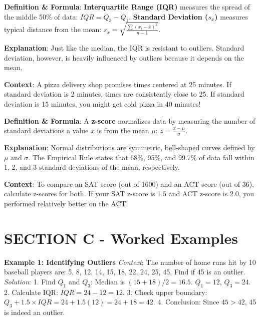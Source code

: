 \begin{lessonbox}
\textbf{Definition \& Formula}:
\textbf{Interquartile Range (IQR)} measures the spread of the middle 50\% of data: $IQR = Q_3 - Q_1$.
\textbf{Standard Deviation ($s_x$)} measures typical distance from the mean: $s_x = \sqrt{\frac{\sum (x_i - \bar{x})^2}{n-1}}$.

\textbf{Explanation}: Just like the median, the IQR is resistant to outliers. Standard deviation, however, is heavily influenced by outliers because it depends on the mean.

\textbf{Context}: A pizza delivery shop promises times centered at 25 minutes. If standard deviation is 2 minutes, times are consistently close to 25. If standard deviation is 15 minutes, you might get cold pizza in 40 minutes!
\end{lessonbox}

\begin{lessonbox}
\textbf{Definition \& Formula}: A \textbf{z-score} normalizes data by measuring the number of standard deviations a value $x$ is from the mean $\mu$: $z = \frac{x - \mu}{\sigma}$.

\textbf{Explanation}: Normal distributions are symmetric, bell-shaped curves defined by $\mu$ and $\sigma$. The Empirical Rule states that 68\%, 95\%, and 99.7\% of data fall within 1, 2, and 3 standard deviations of the mean, respectively.

\textbf{Context}: To compare an SAT score (out of 1600) and an ACT score (out of 36), calculate z-scores for both. If your SAT z-score is 1.5 and ACT z-score is 2.0, you performed relatively better on the ACT!
\end{lessonbox}

\section{SECTION C - Worked Examples}

\textbf{Example 1: Identifying Outliers}
\textit{Context}: The number of home runs hit by 10 baseball players are: 5, 8, 12, 14, 15, 18, 22, 24, 25, 45. Find if 45 is an outlier.
\textit{Solution}:
1. Find $Q_1$ and $Q_3$: Median is $(15+18)/2 = 16.5$. $Q_1 = 12$, $Q_3 = 24$.
2. Calculate IQR: $IQR = 24 - 12 = 12$.
3. Check upper boundary: $Q_3 + 1.5 \times IQR = 24 + 1.5(12) = 24 + 18 = 42$.
4. Conclusion: Since $45 > 42$, 45 is indeed an outlier.

